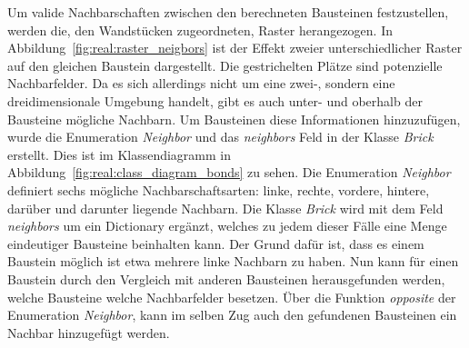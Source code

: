 Um valide Nachbarschaften zwischen den berechneten Bausteinen festzustellen, werden die, den Wandstücken zugeordneten, Raster herangezogen.
In Abbildung~\ref{fig:real:raster_neigbors} ist der Effekt zweier unterschiedlicher Raster auf den gleichen Baustein dargestellt.
Die gestrichelten Plätze sind potenzielle Nachbarfelder.
Da es sich allerdings nicht um eine zwei-, sondern eine dreidimensionale Umgebung handelt, gibt es auch unter- und oberhalb der Bausteine mögliche Nachbarn.
Um Bausteinen diese Informationen hinzuzufügen, wurde die Enumeration \textit{Neighbor} und das \textit{neighbors} Feld in der Klasse \textit{Brick} erstellt.
Dies ist im Klassendiagramm in Abbildung~\ref{fig:real:class_diagram_bonds} zu sehen.
Die Enumeration \textit{Neighbor} definiert sechs mögliche Nachbarschaftsarten: linke, rechte, vordere, hintere, darüber und darunter liegende Nachbarn.
Die Klasse \textit{Brick} wird mit dem Feld \textit{neighbors} um ein Dictionary ergänzt, welches zu jedem dieser Fälle eine Menge eindeutiger Bausteine beinhalten kann.
Der Grund dafür ist, dass es einem Baustein möglich ist etwa mehrere linke Nachbarn zu haben.
Nun kann für einen Baustein durch den Vergleich mit anderen Bausteinen herausgefunden werden, welche Bausteine welche Nachbarfelder besetzen.
Über die Funktion \textit{opposite} der Enumeration \textit{Neighbor}, kann im selben Zug auch den gefundenen Bausteinen ein Nachbar hinzugefügt werden.


